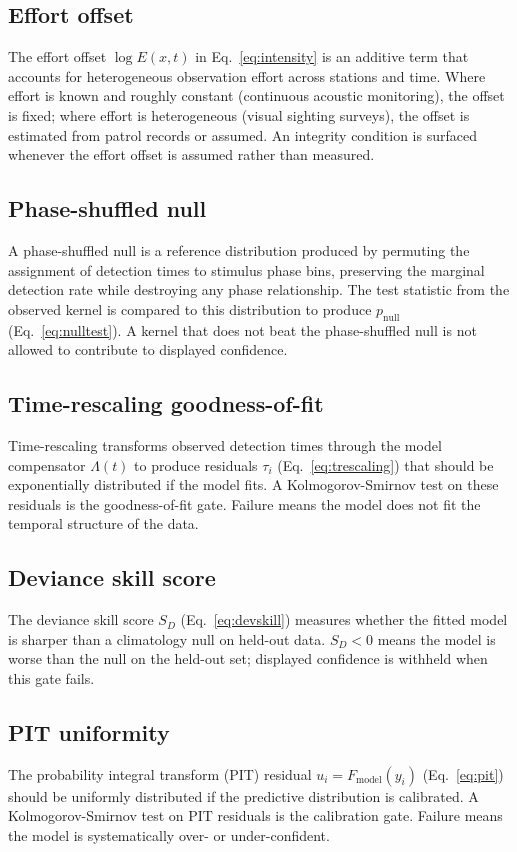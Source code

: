 \subsection*{Effort offset}
The effort offset $\log E(x,t)$ in Eq.~\ref{eq:intensity} is an additive term that accounts for heterogeneous observation effort across stations and time. Where effort is known and roughly constant (continuous acoustic monitoring), the offset is fixed; where effort is heterogeneous (visual sighting surveys), the offset is estimated from patrol records or assumed. An integrity condition is surfaced whenever the effort offset is assumed rather than measured.

\subsection*{Phase-shuffled null}
A phase-shuffled null is a reference distribution produced by permuting the assignment of detection times to stimulus phase bins, preserving the marginal detection rate while destroying any phase relationship. The test statistic from the observed kernel is compared to this distribution to produce $p_\mathrm{null}$ (Eq.~\ref{eq:nulltest}). A kernel that does not beat the phase-shuffled null is not allowed to contribute to displayed confidence.

\subsection*{Time-rescaling goodness-of-fit}
Time-rescaling transforms observed detection times through the model compensator $\Lambda(t)$ to produce residuals $\tau_i$ (Eq.~\ref{eq:trescaling}) that should be exponentially distributed if the model fits. A Kolmogorov-Smirnov test on these residuals is the goodness-of-fit gate. Failure means the model does not fit the temporal structure of the data.

\subsection*{Deviance skill score}
The deviance skill score $S_D$ (Eq.~\ref{eq:devskill}) measures whether the fitted model is sharper than a climatology null on held-out data. $S_D < 0$ means the model is worse than the null on the held-out set; displayed confidence is withheld when this gate fails.

\subsection*{PIT uniformity}
The probability integral transform (PIT) residual $u_i = F_\mathrm{model}(y_i)$ (Eq.~\ref{eq:pit}) should be uniformly distributed if the predictive distribution is calibrated. A Kolmogorov-Smirnov test on PIT residuals is the calibration gate. Failure means the model is systematically over- or under-confident.

